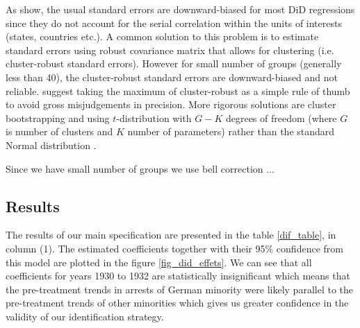 As \citet{bertrand_how_2004} show, the usual standard errors  are downward-biased for most DiD regressions since they do not account for the serial correlation within the units of interests (states, countries etc.). A common solution to this problem is to estimate standard errors using robust covariance matrix that allows for clustering (i.e. cluster-robust standard errors). However for small number of groups (generally less than 40), the cluster-robust standard errors are downward-biased and not reliable. \citet[chapter 8]{angrist_mostly_2009} suggest taking the maximum of cluster-robust as a simple rule of thumb to avoid gross misjudgements in precision. More rigorous solutions are cluster bootstrapping \citep{cameron_bootstrap-based_2008, cameron_practitioners_2015} and  using $t$-distribution with $G- K$ degrees of freedom (where $G$ is number of clusters and $K$ number of parameters) rather than the standard Normal distribution \citep{mccaffrey_bias_2002, imbens_robust_2016}. 

Since we have small number of groups we use bell correction ...  

\subsection{Results}

The results of our main specification are presented in the table \ref{dif_table}, in column (1). The estimated coefficients together with their 95\% confidence  from this model are plotted in the figure \ref{fig_did_effets}. We can see that all coefficients for years 1930 to 1932 are statistically insignificant which means that the pre-treatment trends in arrests of German minority were likely parallel to the pre-treatment trends of other minorities which gives us greater  confidence in the validity of our identification strategy. 

